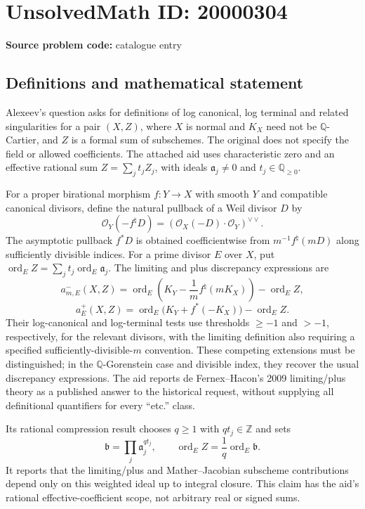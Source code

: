 \documentclass[11pt]{article}
\newcommand{\Z}{\mathbb{Z}}
\newcommand{\Q}{\mathbb{Q}}
\begin{document}
\section*{UnsolvedMath ID: 20000304}
\textbf{Source problem code:} catalogue entry
\subsection{Definitions and mathematical statement}
Alexeev's question asks for definitions of log canonical, log terminal and related singularities for a pair \((X,Z)\), where \(X\) is normal and \(K_X\) need not be \(\Q\)-Cartier, and \(Z\) is a formal sum of subschemes. The original does not specify the field or allowed coefficients. The attached aid uses characteristic zero and an effective rational sum \(Z=\sum_jt_jZ_j\), with ideals \(\mathfrak a_j\ne0\) and \(t_j\in\Q_{\geq0}\).

For a proper birational morphism \(f:Y\to X\) with smooth \(Y\) and compatible canonical divisors, define the natural pullback of a Weil divisor \(D\) by
\[
\mathcal O_Y(-f^{\natural}D)=
(\mathcal O_X(-D)\cdot\mathcal O_Y)^{\vee\vee}.
\]
The asymptotic pullback \(f^*D\) is obtained coefficientwise from \(m^{-1}f^{\natural}(mD)\) along sufficiently divisible indices. For a prime divisor \(E\) over \(X\), put \(\operatorname{ord}_E Z=\sum_jt_j\operatorname{ord}_E\mathfrak a_j\). The limiting and plus discrepancy expressions are
\[
a^-_{m,E}(X,Z)=\operatorname{ord}_E\!\left(K_Y-\frac1m f^{\natural}(mK_X)\right)-\operatorname{ord}_E Z,
\]
\[
a^+_E(X,Z)=\operatorname{ord}_E\bigl(K_Y+f^*(-K_X)\bigr)-\operatorname{ord}_E Z.
\]
Their log-canonical and log-terminal tests use thresholds \(\geq-1\) and \(>-1\), respectively, for the relevant divisors, with the limiting definition also requiring a specified sufficiently-divisible-\(m\) convention. These competing extensions must be distinguished; in the \(\Q\)-Gorenstein case and divisible index, they recover the usual discrepancy expressions. The aid reports de Fernex--Hacon's 2009 limiting/plus theory as a published answer to the historical request, without supplying all definitional quantifiers for every ``etc.'' class.

Its rational compression result chooses \(q\geq1\) with \(qt_j\in\Z\) and sets
\[
\mathfrak b=\prod_j\mathfrak a_j^{qt_j},\qquad
\operatorname{ord}_E Z=\frac1q\operatorname{ord}_E\mathfrak b.
\]
It reports that the limiting/plus and Mather--Jacobian subscheme contributions depend only on this weighted ideal up to integral closure. This claim has the aid's rational effective-coefficient scope, not arbitrary real or signed sums.
\end{document}
